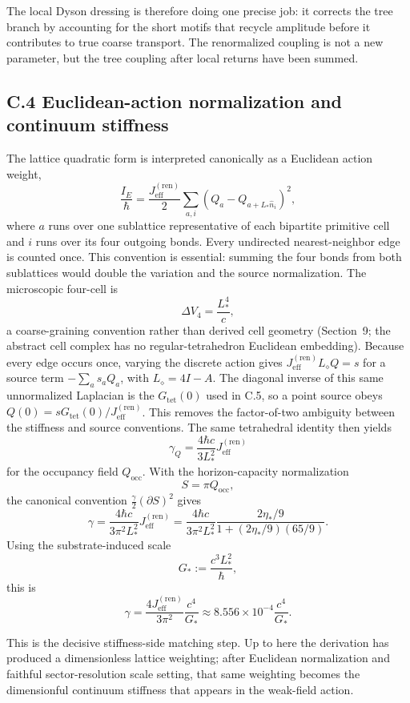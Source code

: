 \documentclass[11pt]{article}
\begin{document}
The local Dyson dressing is therefore doing one precise job: it corrects the tree branch by accounting for the short motifs that recycle amplitude before it contributes to true coarse transport. The renormalized coupling is not a new parameter, but the tree coupling after local returns have been summed.

\subsection*{C.4 Euclidean-action normalization and continuum stiffness}

The lattice quadratic form is interpreted canonically as a Euclidean action weight,
\[
\frac{I_E}{\hbar}
=
\frac{J_{\mathrm{eff}}^{(\mathrm{ren})}}{2}
\sum_{a,i}(Q_a-Q_{a+L_*\hat n_i})^2,
\]
where $a$ runs over one sublattice representative of each bipartite primitive cell and $i$ runs over its four outgoing bonds. Every undirected nearest-neighbor edge is counted once. This convention is essential: summing the four bonds from both sublattices would double the variation and the source normalization. The microscopic four-cell is
\[
\Delta V_4=\frac{L_*^4}{c},
\]
a coarse-graining convention rather than derived cell geometry (Section~9; the abstract cell complex has no regular-tetrahedron Euclidean embedding).
Because every edge occurs once, varying the discrete action gives $J_{\mathrm{eff}}^{(\mathrm{ren})}L_\diamond Q=s$ for a source term $-\sum_a s_aQ_a$, with $L_\diamond=4I-A$. The diagonal inverse of this same unnormalized Laplacian is the $G_{\mathrm{tet}}(0)$ used in C.5, so a point source obeys $Q(0)=sG_{\mathrm{tet}}(0)/J_{\mathrm{eff}}^{(\mathrm{ren})}$. This removes the factor-of-two ambiguity between the stiffness and source conventions.
The same tetrahedral identity then yields
\[
\gamma_Q=\frac{4\hbar c}{3L_*^2}J_{\mathrm{eff}}^{(\mathrm{ren})}
\]
for the occupancy field $Q_{\mathrm{occ}}$. With the horizon-capacity normalization
\[
S=\pi Q_{\mathrm{occ}},
\]
the canonical convention $\frac{\gamma}{2}(\partial S)^2$ gives
\[
\gamma
=
\frac{4\hbar c}{3\pi^2L_*^2}J_{\mathrm{eff}}^{(\mathrm{ren})}
=
\frac{4\hbar c}{3\pi^2L_*^2}
\frac{2\eta_*/9}{1+(2\eta_*/9)(65/9)}.
\]
Using the substrate-induced scale
\[
G_*:=\frac{c^3L_*^2}{\hbar},
\]
this is
\[
\gamma
=
\frac{4J_{\mathrm{eff}}^{(\mathrm{ren})}}{3\pi^2}\frac{c^4}{G_*}
\approx
8.556\times10^{-4}\frac{c^4}{G_*}.
\]

This is the decisive stiffness-side matching step. Up to here the derivation has produced a dimensionless lattice weighting; after Euclidean normalization and faithful sector-resolution scale setting, that same weighting becomes the dimensionful continuum stiffness that appears in the weak-field action.
\end{document}
